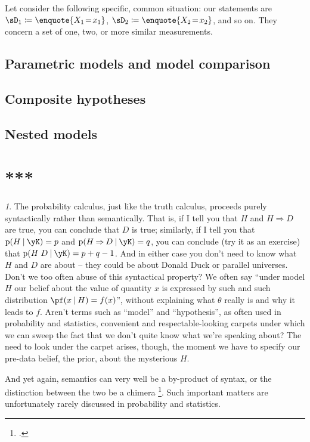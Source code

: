 \documentclass[\ifafour a4paper,12pt,\else a5paper,10pt,\fi%
onecolumn,oneside,article,%
british%
]{memoir}
\theoremstyle{remark}
\theoremstyle{innote}
\newtheorem*{innote}{}
\newcommand*{\citep}{\footcites}
\newcommand*{\defd}{\coloneqq}
\newcommand*{\limplies}{\mathbin{\Rightarrow}}%
\newcommand*{\p}{\mathrm{p}}%
\renewcommand*{\|}[1][]{\nonscript\:#1\vert\nonscript\:\mathopen{}}
\newcommand*{\eq}{\mathrel{\!=\!}}
\renewcommand*{\=}{\TextOrMath\texteq\eq}
\begin{document}
Let consider the following specific, common situation: our statements are
$\sD_{1} \defd \enquote{X_{1}\eq x_{1}}$,
$\sD_{2} \defd \enquote{X_{2}\eq x_{2}}$, and so on. They concern a set of
one, two, or more similar measurements.

\subsection{Parametric models and model comparison}
\label{sec:param_mods}




\subsection{Composite hypotheses}
\label{sec:comp_hyp}


\subsection{Nested models}
\label{sec:nested_mods}



\section{***}
\label{sec:***}



\begin{innote}\label{note:syntax}
  The probability calculus, just like the truth calculus, proceeds purely
  syntactically rather than semantically. That is, if I tell you that $H$
  and $H \limplies D$ are true, you can conclude that $D$ is true;
  similarly, if I tell you that $\p(H \| \yK) = p$ and
  $\p(H \limplies D \| \yK) = q$, you can conclude (try it as an exercise)
  that $\p(H\;D \| \yK) = p + q -1$. And in either case you don't need to
  know what $H$ and $D$ are about -- they could be about Donald Duck or
  parallel universes. Don't we too often abuse of this syntactical
  property? We often say \enquote{under model $H$ our belief about the
    value of quantity $x$ is expressed by such and such distribution
    $\pf(x \| H)=f(x)$}, without explaining what $\theta$ really is
  and why it leads to $f$. Aren't terms such as \enquote{model} and
  \enquote{hypothesis}, as often used in probability and statistics,
  convenient and respectable-looking carpets under which we can sweep the
  fact that we don't quite know what we're speaking about? The need to look
  under the carpet arises, though, the moment we have to specify our
  pre-data belief, the prior, about the mysterious $H$.
  
  And yet again, semantics can very well be a by-product of syntax, or the
  distinction between the two be a chimera
  \citep{wittgenstein1945_t1999,girard2001,girard2003}. Such important
  matters are unfortunately rarely discussed in probability and statistics.
\end{innote}
\end{document}
